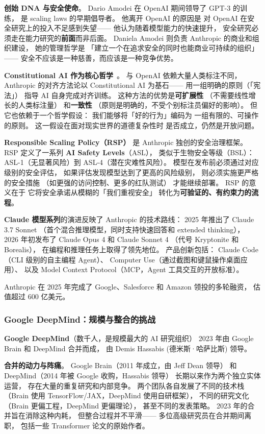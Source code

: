 \textbf{创始 DNA 与安全使命}。
Dario Amodei 在 OpenAI 期间领导了 GPT-3 的训练，
是 scaling laws 的早期倡导者。
他离开 OpenAI 的原因是
对 OpenAI 在安全研究上的投入不足感到失望——
他认为随着模型能力的快速提升，
安全研究必须走在能力研究的\textbf{前面}而非后面。
Daniela Amodei 则负责 Anthropic 的商业和组织建设，
她的管理哲学是
「建立一个在追求安全的同时也能商业可持续的组织」——
安全不应该是一种慈善，而应该是一种竞争优势。

\textbf{Constitutional AI 作为核心哲学}~\cite{bai2022constitutional}。
与 OpenAI 依赖大量人类标注不同，
Anthropic 的对齐方法论以 Constitutional AI 为基石——
用一组明确的原则（「宪法」）
指导 AI 自身完成对齐训练。
这种方法的优势是\textbf{可扩展性}
（不需要线性增长的人类标注量）
和\textbf{一致性}
（原则是明确的，不受个别标注员偏好的影响）。
但它也依赖于一个哲学假设：
我们能够将「好的行为」编码为
一组有限的、可操作的原则。
这一假设在面对现实世界的道德复杂性时
是否成立，仍然是开放问题。

\textbf{Responsible Scaling Policy（RSP）}
是 Anthropic 独创的安全治理框架。
RSP 定义了一系列 \textbf{AI Safety Levels}（ASL），
类似于生物安全等级（BSL）：
ASL-1（无显著风险）到 ASL-4（潜在灾难性风险）。
模型在发布前必须通过对应级别的安全评估，
如果评估发现模型达到了更高的风险级别，
则必须实施更严格的安全措施
（如更强的访问控制、更多的红队测试）
才能继续部署。
RSP 的意义在于
它将安全承诺从模糊的「我们重视安全」
转化为\textbf{可验证的、有约束力的流程}。

\textbf{Claude 模型系列}的演进反映了 Anthropic 的技术路线：
2025 年推出了 Claude 3.7 Sonnet
（首个混合推理模型，同时支持快速回答和 extended thinking），
2026 年初发布了 Claude Opus 4 和 Claude Sonnet 4
（代号 Kryptonite 和 Borealis），
在编程和推理任务上取得了领先地位。
产品创新包括：
Claude Code（CLI 级别的自主编程 Agent）、
Computer Use（通过截图和键鼠操作桌面应用）、
以及 Model Context Protocol（MCP，Agent 工具交互的开放标准）。

Anthropic 在 2025 年完成了
Google、Salesforce 和 Amazon 领投的多轮融资，
估值超过 600 亿美元。

\subsubsection{Google DeepMind：规模与整合的挑战}

\textbf{Google DeepMind}（数千人，是规模最大的 AI 研究组织）
2023 年由 Google Brain 和 DeepMind 合并而成，
由 Demis Hassabis (德米斯·哈萨比斯) 领导。

\textbf{合并的动力与阵痛}。
Google Brain（2011 年成立，由 Jeff Dean 领导）
和 DeepMind（2014 年被 Google 收购，Hassabis 领导）
长期以来作为两个独立实体运营，
存在大量的重复研究和内部竞争。
两个团队各自发展了不同的技术栈
（Brain 使用 TensorFlow/JAX，DeepMind 使用自研框架），
不同的研究文化
（Brain 更偏工程，DeepMind 更偏理论），
甚至不同的发表策略。
2023 年的合并旨在消除这种内耗，
但整合过程并不平滑——
多位高级研究员在合并期间离职，
包括一些 Transformer 论文的原始作者。

